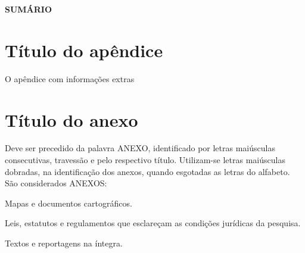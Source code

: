 \documentclass[
	12pt,				%
	openright,			%
	oneside,			%
	a4paper,			%
	chapter=TITLE,		%
	english,			%
	french,				%
	spanish,			%
	brazil				%
]{abnt/abntex2itv_report}
\begin{document}

\begin{flushleft}
\ABNTEXchapterfont\Large\textbf{SUMÁRIO}
\end{flushleft}
\vspace*{-36pt}
\tableofcontents*
\justify



\setlength\beforechapskip{-24pt}
\setlength\afterchapskip{12pt}
\textual
\pagestyle{plain}
\normalsize
\justify
\normalfont




\titleformat{\chapter}[display]
    {\Large\bfseries}{\vspace*{-36pt}\chaptertitlename\ \thechapter}{12pt}{\Large}




\apendices
\justify
\chapter{Título do apêndice}
O apêndice com informações extras


\anexos
\justify
\chapter{Título do anexo}

Deve ser precedido da palavra ANEXO, identificado por letras maiúsculas consecutivas, travessão e pelo respectivo título. Utilizam-se letras maiúsculas dobradas, na identificação dos anexos, quando esgotadas as letras do alfabeto. 
São considerados ANEXOS: 

Mapas e documentos cartográficos. 

Leis, estatutos e regulamentos que esclareçam as condições jurídicas da pesquisa. 

Textos e reportagens na íntegra.
\end{document}
